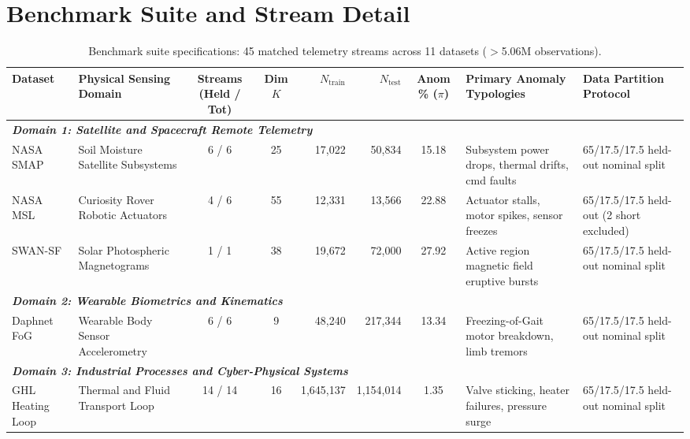 \section{Benchmark Suite and Stream Detail}
\label{sup:dataset_detail}

\begin{table}[t]
\centering
\caption{Benchmark suite specifications: 45 matched telemetry streams across 11 datasets ($>$5.06M observations).}
\label{tab:dataset_specs}
\scriptsize
\scriptsize
\setlength{\tabcolsep}{2.5pt}
\begin{tabular}{@{}ll c c r r c l l@{}}
\toprule
\textbf{Dataset} & \textbf{Physical Sensing Domain} & \textbf{Streams (Held / Tot)} & \textbf{Dim $K$} & \textbf{$N_{\text{train}}$} & \textbf{$N_{\text{test}}$} & \textbf{Anom \% ($\pi$)} & \textbf{Primary Anomaly Typologies} & \textbf{Data Partition Protocol} \\
\midrule
\multicolumn{9}{l}{\textit{\textbf{Domain 1: Satellite and Spacecraft Remote Telemetry}}} \\
NASA SMAP \cite{Hundman2018b}    & Soil Moisture Satellite Subsystems & 6 / 6   & 25 & 17,022    & 50,834    & 15.18 & Subsystem power drops, thermal drifts, cmd faults & 65/17.5/17.5 held-out nominal split \\
NASA MSL \cite{Hundman2018b}     & Curiosity Rover Robotic Actuators  & 4 / 6   & 55 & 12,331    & 13,566    & 22.88 & Actuator stalls, motor spikes, sensor freezes     & 65/17.5/17.5 held-out (2 short excluded) \\
SWAN-SF \cite{angryk2020multivariate}& Solar Photospheric Magnetograms   & 1 / 1   & 38 & 19,672    & 72,000    & 27.92 & Active region magnetic field eruptive bursts      & 65/17.5/17.5 held-out nominal split \\
\midrule
\multicolumn{9}{l}{\textit{\textbf{Domain 2: Wearable Biometrics and Kinematics}}} \\
Daphnet FoG \cite{bachlin2010wearable}& Wearable Body Sensor Accelerometry& 6 / 6   & 9  & 48,240    & 217,344   & 13.34 & Freezing-of-Gait motor breakdown, limb tremors    & 65/17.5/17.5 held-out nominal split \\
\midrule
\multicolumn{9}{l}{\textit{\textbf{Domain 3: Industrial Processes and Cyber-Physical Systems}}} \\
GHL Heating Loop                 & Thermal and Fluid Transport Loop   & 14 / 14 & 16 & 1,645,137 & 1,154,014 & 1.35  & Valve sticking, heater failures, pressure surge   & 65/17.5/17.5 held-out nominal split \\

\end{tabular}
\end{table}
